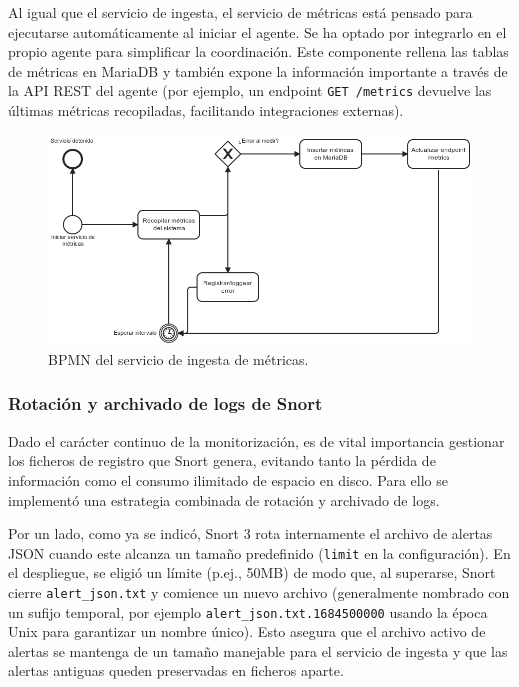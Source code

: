 \documentclass[11pt,a4paper,twoside]{report}
\begin{document}
Al igual que el servicio de ingesta, el servicio de métricas está pensado para ejecutarse automáticamente al iniciar el agente. Se ha optado por integrarlo en el propio agente para simplificar la coordinación. Este componente rellena las tablas de métricas en MariaDB y también expone la información importante a través de la API REST del agente (por ejemplo, un endpoint \verb|GET /metrics| devuelve las últimas métricas recopiladas, facilitando integraciones externas).

\begin{figure}[H]
	\centering
	\includegraphics[width=1\textwidth]{documento/24.png}
	\caption{BPMN del servicio de ingesta de métricas.}
	\label{fig:bpmn-servicio-metricas}
\end{figure}

\subsubsection{Rotación y archivado de logs de Snort}

Dado el carácter continuo de la monitorización, es de vital importancia gestionar los ficheros de registro que Snort genera, evitando tanto la pérdida de información como el consumo ilimitado de espacio en disco. Para ello se implementó una estrategia combinada de rotación y archivado de logs.\newline

Por un lado, como ya se indicó, Snort 3 rota internamente el archivo de alertas JSON cuando este alcanza un tamaño predefinido (\texttt{limit} en la configuración). En el despliegue, se eligió un límite (p.ej., 50MB) de modo que, al superarse, Snort cierre \texttt{alert\_json.txt} y comience un nuevo archivo (generalmente nombrado con un sufijo temporal, por ejemplo \texttt{alert\_json.txt.1684500000} usando la época Unix para garantizar un nombre único). Esto asegura que el archivo activo de alertas se mantenga de un tamaño manejable para el servicio de ingesta y que las alertas antiguas queden preservadas en ficheros aparte.\newline
\end{document}
